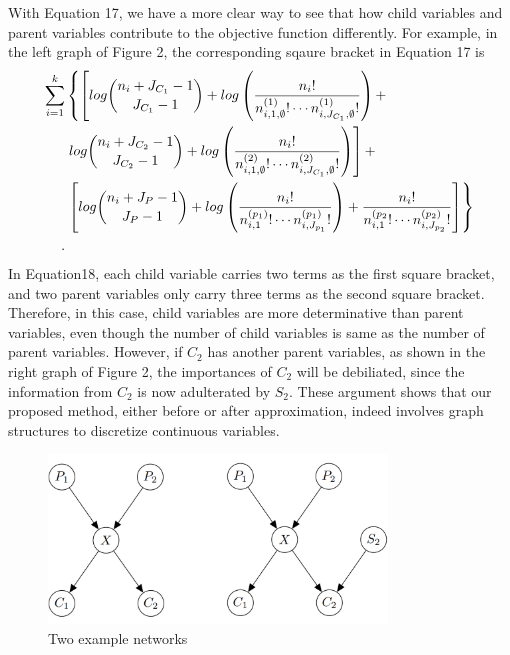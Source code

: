 With Equation 17, we have a more clear way to see that how child variables and parent variables contribute to the objective function differently. For example, in the left graph of Figure 2, the corresponding sqaure bracket in Equation 17 is
\begin{equation}
\begin{aligned}
 \sum_{i=1}^k & \left\lbrace   \left[ log{{n_{i} + J_{C_1} - 1}\choose{J_{C_1}-1}} + log \left(  {{{n_i}!} \over { {n^{(1)}_{i,1,\emptyset} !} \cdots {n^{(1)}_{i,J_{C_1},\emptyset} !}} }  \right)  +  \right. \right.\\ 
& \left.  log{{n_{i} + J_{C_2} - 1}\choose{J_{C_2}-1}} + log \left(  {{{n_i}!} \over { {n^{(2)}_{i,1,\emptyset} !} \cdots {n^{(2)}_{i,J_{C_1},\emptyset} !}} }  \right)  \right] + \\
&  \left. \left[  log {{n_{i} + J_P - 1}\choose{J_P-1}} +  log \left( { {{{n}_i}!}\over{ {n^{(p_1)}_{i,1} !}\cdots {n^{(p_1)}_{i,J_{p_1}} !}}} \right) +{ {{{n}_i}!}\over{ {n^{(p_2}_{i,1} !}\cdots {n^{(p_2)}_{i,J_{p_2}} !}}}  \right] \right\rbrace\\ .
\end{aligned}
\end{equation}
In Equation18, each child variable carries two terms as the first square bracket, and two parent variables only carry three terms as the second square bracket. Therefore, in this case, child variables are more determinative than parent variables, even though the number of child variables is same as the number of parent variables. However, if $C_2$ has another parent variables, as shown in the right graph of Figure 2, the importances of $C_2$ will be debiliated, since the information from $C_2$ is now adulterated by $S_2$. These argument shows that our proposed method, either before or after approximation, indeed involves graph structures to discretize continuous variables.


\begin{figure}
  \includegraphics[width=9cm]{graph2.png}
\caption{Two example networks}
\label{fig:2}       %
\end{figure}

